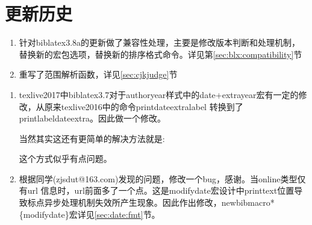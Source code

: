 \section{更新历史}
\label{up:171121}
\begin{enumerate}
\item 针对biblatex3.8a的更新做了兼容性处理，主要是修改版本判断和处理机制，替换新的宏包选项，替换新的排序格式命令。详见第\ref{sec:blx:compatibility}节

\item 重写了范围解析函数，详见\ref{sec:cjkjudge}节

\end{enumerate}

\label{up:170411}
\begin{enumerate}
\item texlive2017中biblatex3.7对于authoryear样式中的date+extrayear宏有一定的修改，从原来texlive2016中的命令printdateextralabel 转换到了printlabeldateextra。因此做一个修改。
    \begin{texlist}
\iftoggle{iftexliveseven}{%
  \renewbibmacro*{date+extrayear}{%
    \iffieldundef{labelyear}
      {}
      {\printtext{%
         \iffieldsequal{year}{labelyear}
           {\printlabeldateextra}%
           {\printfield{labelyear}%
            \printfield{extrayear}}}}}%
}{%
\renewbibmacro*{date+extrayear}{%
    \iffieldundef{\thefield{datelabelsource}year}
      {}
      {\printtext{%
         \iffieldsequal{year}{\thefield{datelabelsource}year}
           {\printdateextralabel}%
           {\printfield{labelyear}%
            \printfield{extrayear}}}}}%
}
    \end{texlist}

    当然其实这还有更简单的解决方法就是:
    \begin{texlist}
    \let\printdateextralabel=\printlabeldateextra
    \end{texlist}
    这个方式似乎有点问题。

\item 根据同学(zjsdut@163.com)发现的问题，修改一个bug，感谢。当online类型仅有url 信息时，url前面多了一个点。这是modifydate宏设计中printtext位置导致标点异步处理机制失效所产生现象。因此作出修改，newbibmacro*\{modifydate\}宏详见\ref{sec:date:fmt}节。



\end{enumerate}
